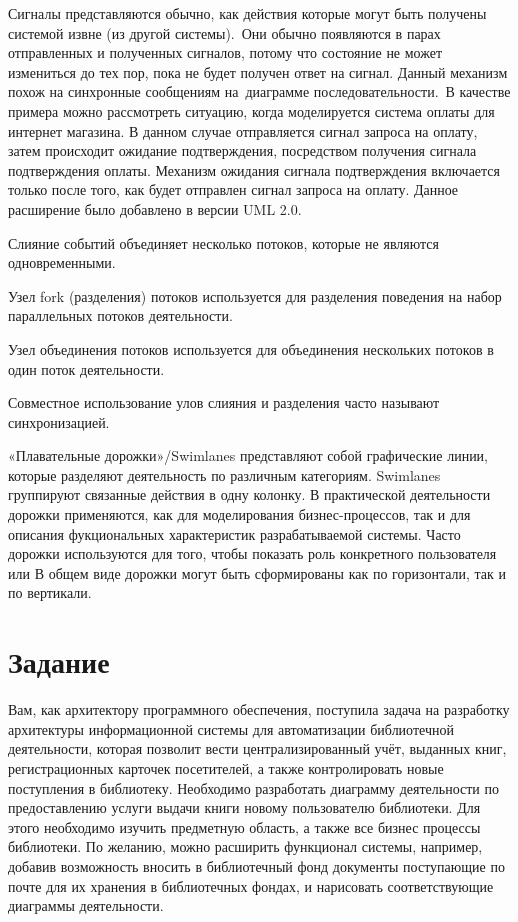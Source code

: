 Сигналы представляются обычно, как действия которые могут быть получены системой извне (из другой системы). Они обычно появляются в парах отправленных и полученных сигналов, потому что состояние не может измениться до тех пор, пока не будет получен ответ на сигнал. Данный механизм похож на синхронные сообщениям на диаграмме последовательности. В качестве примера можно рассмотреть ситуацию, когда моделируется система оплаты для интернет магазина. В данном случае отправляется сигнал запроса на оплату, затем происходит ожидание подтверждения, посредством получения сигнала подтверждения оплаты. Механизм ожидания сигнала подтверждения включается только после того, как будет отправлен сигнал запроса на оплату. Данное расширение было добавлено в версии UML 2.0.

Слияние событий объединяет несколько потоков, которые не являются одновременными.

Узел fork (разделения) потоков используется для разделения поведения на набор параллельных потоков деятельности.

Узел объединения потоков используется для объединения нескольких потоков в один поток деятельности.

Совместное использование улов слияния и разделения часто называют синхронизацией.

«Плавательные дорожки»/Swimlanes представляют собой графические линии, которые разделяют деятельность по различным категориям. Swimlanes группируют связанные действия в одну колонку. В практической деятельности дорожки применяются, как для моделирования бизнес-процессов, так и для описания фукциональных характеристик разрабатываемой системы. Часто дорожки используются для того, чтобы показать роль конкретного пользователя или
В общем виде дорожки могут быть сформированы как по горизонтали, так и по вертикали.

\section{Задание}

Вам, как архитектору программного обеспечения, поступила задача на разработку архитектуры информационной системы для автоматизации библиотечной деятельности, которая позволит вести централизированный учёт, выданных книг, регистрационных карточек посетителей, а также контролировать новые поступления в библиотеку. Необходимо разработать диаграмму деятельности по предоставлению услуги выдачи книги новому пользователю библиотеки. Для этого необходимо изучить предметную область, а также все бизнес процессы библиотеки. По желанию, можно расширить функционал системы, например, добавив возможность вносить в библиотечный фонд документы поступающие по почте для их хранения в библиотечных фондах, и нарисовать соответствующие диаграммы деятельности.

